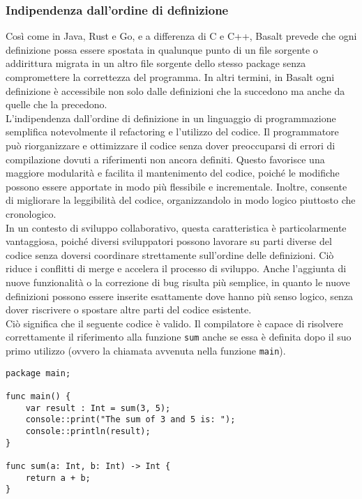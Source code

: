 \subsubsection{Indipendenza dall’ordine di definizione}
Così come in Java, Rust e Go, e a differenza di C e C++, Basalt prevede che ogni definizione possa essere spostata in qualunque punto di un file sorgente o addirittura migrata in 
un altro file sorgente dello stesso package senza compromettere la correttezza del programma. In altri termini, in Basalt ogni definizione è accessibile non solo dalle definizioni che 
la succedono ma anche da quelle che la precedono. \\

L'indipendenza dall'ordine di definizione in un linguaggio di programmazione semplifica notevolmente il refactoring e l'utilizzo del codice. Il programmatore può riorganizzare e ottimizzare 
il codice senza dover preoccuparsi di errori di compilazione dovuti a riferimenti non ancora definiti. Questo favorisce una maggiore modularità e facilita il mantenimento del codice, poiché 
le modifiche possono essere apportate in modo più flessibile e incrementale. Inoltre, consente di migliorare la leggibilità del codice, organizzandolo in modo logico piuttosto che cronologico. \\

In un contesto di sviluppo collaborativo, questa caratteristica è particolarmente vantaggiosa, poiché diversi sviluppatori possono lavorare su parti diverse del codice senza doversi coordinare 
strettamente sull'ordine delle definizioni. Ciò riduce i conflitti di merge e accelera il processo di sviluppo. Anche l'aggiunta di nuove funzionalità o la correzione di bug risulta più semplice, 
in quanto le nuove definizioni possono essere inserite esattamente dove hanno più senso logico, senza dover riscrivere o spostare altre parti del codice esistente. \\

Ciò significa che il seguente codice è valido. Il compilatore è capace di risolvere correttamente il riferimento alla 
funzione \texttt{sum} anche se essa è definita dopo il suo primo utilizzo (ovvero la chiamata avvenuta nella funzione \texttt{main}). \\

\begin{lstlisting}[frame=single]
package main;

func main() {
    var result : Int = sum(3, 5);
    console::print("The sum of 3 and 5 is: ");
    console::println(result);
}

func sum(a: Int, b: Int) -> Int {
    return a + b;
}
\end{lstlisting}